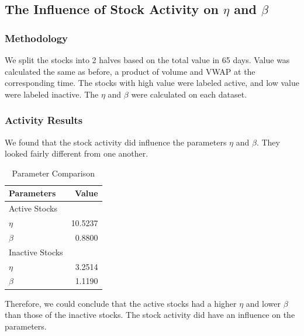 \documentclass{article}
\begin{document}
\subsection{The Influence of Stock Activity on $\eta$ and $\beta$}

\subsubsection{Methodology}
We split the stocks into 2 halves based on the total value in 65 days. Value was calculated the same as before, a product of volume and VWAP at the corresponding time. The stocks with high value were labeled active, and low value were labeled inactive.
The $\eta$ and $\beta$ were calculated on each dataset.

\subsubsection{Activity Results}
We found that the stock activity did influence the parameters $\eta$ and $\beta$. They looked fairly different from one another.

\begin{table}[ht]
\centering
\begin{tabular}{l|r}
Parameters & Value \\\hline
Active Stocks \\ \hline
$\eta$ & 10.5237  \\
$\beta$ & 0.8800  \\\hline
Inactive Stocks  \\ \hline
$\eta$ & 3.2514  \\
$\beta$ & 1.1190 \\
\end{tabular}
\caption{\label{tab:activity}Parameter Comparison}
\end{table}

Therefore, we could conclude that the active stocks had a higher $\eta$ and lower $\beta$ than those of the inactive stocks. The stock activity did have an influence on the parameters.

\end{document}
